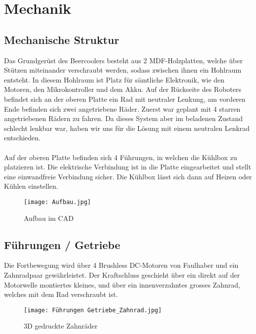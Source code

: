 \section{Mechanik}

\subsection{Mechanische Struktur}
Das Grundgerüst des Beercoolers besteht aus 2 MDF-Holzplatten, welche über Stützen miteinander verschraubt werden, sodass zwischen ihnen ein Hohlraum entsteht. In diesem Hohlraum ist Platz für sämtliche Elektronik, wie den  Motoren, den Mikrokontroller und dem Akku. Auf der Rückseite des Roboters befindet sich an der oberen Platte ein Rad mit neutraler Lenkung, am vorderen Ende befinden sich zwei angetriebene Räder.  Zuerst war geplant mit 4 starren angetriebenen Rädern zu fahren. Da dieses System aber im beladenen Zustand schlecht lenkbar war, haben wir uns für die Lösung mit einem neutralen Lenkrad entschieden.\\
\\
Auf der oberen Platte befinden sich 4 Führungen, in welchen die Kühlbox zu platzieren ist. Die elektrische Verbindung ist in die Platte eingearbeitet und stellt eine einwandfreie Verbindung sicher. Die Kühlbox lässt sich dann auf Heizen oder Kühlen einstellen.

\begin{figure}[H]
    \begin{center}
    \texttt{[image: Aufbau.jpg]}
    \end{center}
    \caption{Aufbau im CAD}
\end{figure}

\subsection{Führungen / Getriebe}
Die Fortbewegung wird über 4 Brushless DC-Motoren von Faulhaber und ein Zahnradpaar gewährleistet. Der Kraftschluss geschieht über ein direkt auf der Motorwelle montiertes kleines, und über ein innenverzahntes grosses Zahnrad, welches mit dem Rad verschraubt ist.\\

\begin{figure}[H]
    \begin{center}
    \texttt{[image: Führungen Getriebe\_Zahnrad.jpg]}
    \end{center}
    \caption{3D gedruckte Zahnräder}
\end{figure}

